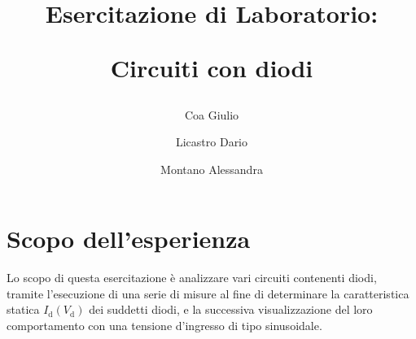 \documentclass[a4paper]{article}
\title{
		\begin{center}
			Esercitazione di Laboratorio:
		\end{center}
		\newline
		\begin{center}
			Circuiti con diodi
		\end{center}
	}
\author{
			Coa Giulio
			\and
			Licastro Dario
			\and
			Montano Alessandra
		}
\begin{document}
	\begin{titlingpage}
		\maketitle
	\end{titlingpage}
	\newpage
	\section{Scopo dell'esperienza}
		Lo scopo di questa esercitazione è analizzare vari circuiti contenenti diodi, tramite l’esecuzione di una serie di misure al fine di determinare la caratteristica statica $ I_{\mathrm{d}}(V_{\mathrm{d}}) $ dei suddetti diodi, e la successiva visualizzazione del loro comportamento con una tensione d'ingresso di tipo sinusoidale.
\end{document}
